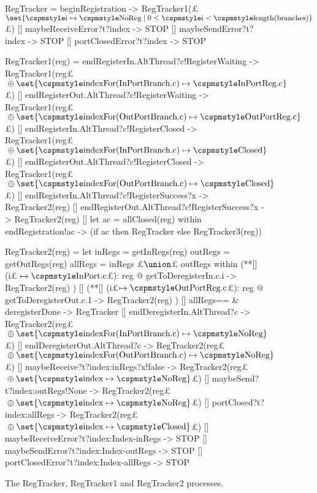 \begin{figure}
\begin{cspm}
RegTracker = 
  beginRegistration -> RegTracker1(£%
    $\set{\CSPMMR{i} \mapsto \CSPMMR{NoReg} \mid 
       0 \le \CSPMMR{i} < \CSPMMR{length(branches})}$£) 
  [] maybeReceiveError?t?index -> STOP
  [] maybeSendError?t?index -> STOP
  [] portClosedError?t?index -> STOP
  
RegTracker1(reg) = 
  endRegisterIn.AltThread?c!RegisterWaiting -> 
     RegTracker1(reg£%
      $\null\oplus \set{\CSPMMR{indexFor(InPortBranch.c)} \mapsto 
         \CSPMMR{InPortReg.c}}$£)
  [] endRegisterOut.AltThread?c!RegisterWaiting -> 
     RegTracker1(reg£%
      $\null\oplus \set{\CSPMMR{indexFor(OutPortBranch.c)} \mapsto 
         \CSPMMR{OutPortReg.c}}$£)
  [] endRegisterIn.AltThread?c!RegisterClosed ->
     RegTracker1(reg£%
      $\null\oplus \set{\CSPMMR{indexFor(InPortBranch.c)} \mapsto 
         \CSPMMR{Closed}}$£) 
  [] endRegisterOut.AltThread?c!RegisterClosed -> 
     RegTracker1(reg£%
      $\null\oplus \set{\CSPMMR{indexFor(OutPortBranch.c)} \mapsto 
         \CSPMMR{Closed}}$£)
  [] endRegisterIn.AltThread?c!RegisterSuccess?x -> RegTracker2(reg)
  [] endRegisterOut.AltThread?c!RegisterSuccess?x -> RegTracker2(reg)
  [] let ac = allClosed(reg) within
     endRegistration!ac -> (if ac then RegTracker else RegTracker3(reg))

RegTracker2(reg) = 
  let inRegs = getInRegs(reg) 
      outRegs = getOutRegs(reg)
      allRegs = inRegs £$\union$£ outRegs within
  (**[] (i£$\null \mapsto \CSPMMR{InPort.c}$£): reg @ getToDeregisterIn.c.i -> RegTracker2(reg) )
  [] (**[] (i£$\mapsto \CSPMMR{OutPortReg.c}$£): reg @ getToDeregisterOut.c.1 -> RegTracker2(reg) )
  [] allRegs=={} & deregisterDone -> RegTracker
  [] endDeregisterIn.AltThread?c -> 
     RegTracker2(reg£%
      $\null\oplus \set{\CSPMMR{indexFor(InPortBranch.c)} \mapsto 
         \CSPMMR{NoReg}}$£)
  [] endDeregisterOut.AltThread?c -> 
     RegTracker2(reg£%
      $\null\oplus \set{\CSPMMR{indexFor(OutPortBranch.c)} \mapsto 
         \CSPMMR{NoReg}}$£)
  [] maybeReceive?t?index:inRegs?x!false -> RegTracker2(reg£%
   $\null\oplus \set{\CSPMMR{index} \mapsto \CSPMMR{NoReg}}$£) 
  [] maybeSend?t?index:outRegs!None -> RegTracker2(reg£%
    $\null\oplus \set{\CSPMMR{index} \mapsto \CSPMMR{NoReg}}$£)
  [] portClosed?t?index:allRegs -> RegTracker2(reg£%
    $\null\oplus \set{\CSPMMR{index} \mapsto \CSPMMR{Closed}}$£)
  [] maybeReceiveError?t?index:Index-inRegs -> STOP
  [] maybeSendError?t?index:Index-outRegs -> STOP
  [] portClosedError?t?index:Index-allRegs -> STOP
\end{cspm}
\caption{The {\scalastyle RegTracker}, {\scalastyle RegTracker1} and
  {\scalastyle RegTracker2} processes.  \label{fig:RegTracker}}
\end{figure}

